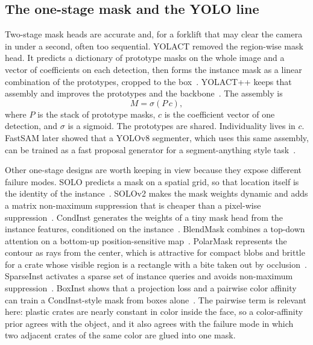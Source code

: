 \subsection{The one-stage mask and the YOLO line}
\label{sec:yolo}

Two-stage mask heads are accurate and, for a forklift that may clear the camera in under a second, often too sequential. YOLACT removed the region-wise mask head. It predicts a dictionary of prototype masks on the whole image and a vector of coefficients on each detection, then forms the instance mask as a linear combination of the prototypes, cropped to the box~\cite{bolya2019yolact}. YOLACT++ keeps that assembly and improves the prototypes and the backbone~\cite{bolya2022yolactpp}. The assembly is
\begin{equation}
M = \sigma\!\left( P\, c \right),
\label{eq:yolact}
\end{equation}
where $P$ is the stack of prototype masks, $c$ is the coefficient vector of one detection, and $\sigma$ is a sigmoid. The prototypes are shared. Individuality lives in $c$. FastSAM later showed that a YOLOv8 segmenter, which uses this same assembly, can be trained as a fast proposal generator for a segment-anything style task~\cite{zhao2023fastsam}.

Other one-stage designs are worth keeping in view because they expose different failure modes. SOLO predicts a mask on a spatial grid, so that location itself is the identity of the instance~\cite{wang2020solo}. SOLOv2 makes the mask weights dynamic and adds a matrix non-maximum suppression that is cheaper than a pixel-wise suppression~\cite{wang2020solov2}. CondInst generates the weights of a tiny mask head from the instance features, conditioned on the instance~\cite{tian2020condinst}. BlendMask combines a top-down attention on a bottom-up position-sensitive map~\cite{chen2020blendmask}. PolarMask represents the contour as rays from the center, which is attractive for compact blobs and brittle for a crate whose visible region is a rectangle with a bite taken out by occlusion~\cite{xie2020polarmask}. SparseInst activates a sparse set of instance queries and avoids non-maximum suppression~\cite{cheng2022sparseinst}. BoxInst shows that a projection loss and a pairwise color affinity can train a CondInst-style mask from boxes alone~\cite{tian2021boxinst}. The pairwise term is relevant here: plastic crates are nearly constant in color inside the face, so a color-affinity prior agrees with the object, and it also agrees with the failure mode in which two adjacent crates of the same color are glued into one mask.

